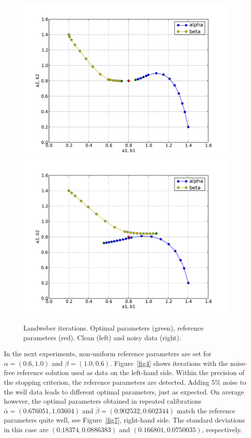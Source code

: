 \begin{figure}
  \begin{center}
    \includegraphics[width=\smallfig]{chapters/schroll/pdf/4Dscan3.pdf}
    \includegraphics[width=\smallfig]{chapters/schroll/pdf/4Dscan3-5.pdf}
    \vspace{-0.7cm}
    \caption{Landweber iterations. Optimal parameters (green), reference
    parameters (red). Clean (left) and noisy data (right).}
    \label{fig3}
  \end{center}
\end{figure}

In the next experiments, non-uniform reference parameters are set for
$\alpha = (0.6, 1.0)$ and $\beta = (1.0, 0.6)$.  Figure~\ref{fig4}
shows iterations with the noise-free reference solution used as data
on the left-hand side.  Within the precision of the stopping
criterion, the reference parameters are detected.  Adding 5\% noise to
the well data leads to different optimal parameters, just as expected.
On average however, the optimal parameters obtained in repeated
calibrations $\bar\alpha=(0.676051, 1.03604)$ and
$\bar\beta=(0.902532, 0.602344)$ match the reference parameters quite
well, see Figure~\ref{fig7}, right-hand side.  The standard deviations
in this case are $(0.18374, 0.0886383)$ and $(0.166801, 0.0750035)$,
respectively.

